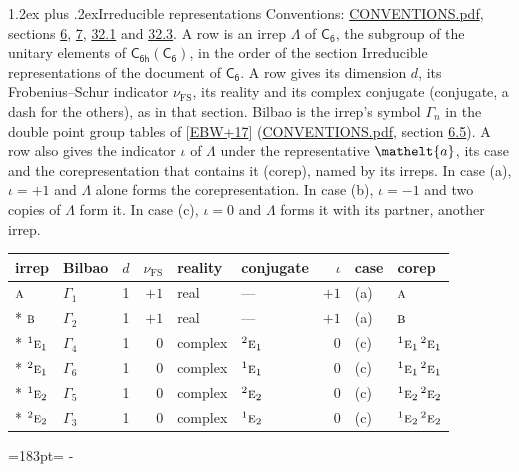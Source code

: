 \documentclass[10pt,a4paper]{article}
\makeatletter
\renewcommand\section{\@startsection{section}{1}{\z@}{-3ex plus -1ex minus -.2ex}%
  {1.2ex plus .2ex}{\normalfont\large\sffamily\bfseries\color{parttitle}}}
\newcommand{\needspace}[1]{\par\penalty-100\begingroup\dimen0=#1\relax\dimen2=\pagegoal
  \advance\dimen2-\pagetotal\ifdim\dimen0>\dimen2\relax\ifdim\dimen2>0pt\vfil\break\fi\fi
  \endgroup}
\numberwithin{equation}{section}
\newcommand{\eltfont}[1]{{\let\sigma\eltsigma\mathelt{#1}}}
\newcommand{\grp}[1]{\mathsf{#1}}
\newcommand{\irr}[1]{\text{\normalfont\scshape #1}}
\newcommand{\conjpair}[1]{{}^{#1}}
\newcommand{\elt}[1]{\eltfont{#1}}
\newcommand{\fsind}{\nu_{\mathrm{FS}}}
\makeatother
\begin{document}
\section{Irreducible representations}\label{s:irreps}
Conventions: \href{../../CONVENTIONS.pdf}{CONVENTIONS.pdf}, sections \href{../../../rotation/CONVENTIONS.pdf\#conv.6}{6}, \href{../../../rotation/CONVENTIONS.pdf\#conv.7}{7}, \href{../../CONVENTIONS.pdf\#conv.32.1}{32.1} and \href{../../CONVENTIONS.pdf\#conv.32.3}{32.3}.
\leavevmode\label{n:irrep.Delta}A row is an irrep $\Lambda$ of $\grp{C_{6}}$, the subgroup of the unitary elements of $\grp{C_{6h}}(\grp{C_{6}})$, in the order of the section Irreducible representations of the document of \href{../../../rotation/data/pdf/C6.pdf}{$\grp{C_{6}}$}. \label{n:index.dimension}\label{n:index.frobenius}\label{n:head.irrep}\label{n:head.reality}\label{n:head.conjugate}A row gives its dimension $d$, its Frobenius--Schur indicator $\fsind$, its reality and its complex conjugate (conjugate, a dash for the others), as in that section. \label{n:head.bilbao}\label{n:irrep.alias.gamma}Bilbao is the irrep's symbol $\Gamma_n$ in the double point group tables of [\href{../../../REFERENCES.pdf\#ref.EBW+17}{EBW+17}] (\href{../../CONVENTIONS.pdf}{CONVENTIONS.pdf}, section \href{../../../rotation/CONVENTIONS.pdf\#conv.6.5}{6.5}). \label{n:head.case.corep}\label{n:head.corep}A row also gives the indicator $\iota$ of $\Lambda$ under the representative $\elt{a}$, its case and the corepresentation that contains it (corep), named by its irreps. In case (a), $\iota = +1$ and $\Lambda$ alone forms the corepresentation. In case (b), $\iota = -1$ and two copies of $\Lambda$ form it. In case (c), $\iota = 0$ and $\Lambda$ forms it with its partner, another irrep.
\setlength{\emergencystretch}{2em}\par\setlength{\emergencystretch}{0pt}
{\small\renewcommand{\arraystretch}{1.25}\setlength{\tabcolsep}{4pt}\begin{longtable}{@{}llrrllrll@{}}\toprule
irrep & Bilbao & $d$ & $\fsind$ & reality & conjugate & $\iota$ & case & corep\\\midrule\endhead
\bottomrule\endfoot\endlastfoot
$\irr{a}$ & $\Gamma_{1}$ & 1 & $+1$ & real & --- & $+1$ & (a) & $\irr{a}$\\*
$\irr{b}$ & $\Gamma_{2}$ & 1 & $+1$ & real & --- & $+1$ & (a) & $\irr{b}$\\*
$\conjpair{1}\irr{e}_{1}$ & $\Gamma_{4}$ & 1 & $0$ & complex & $\conjpair{2}\irr{e}_{1}$ & $0$ & (c) & $\conjpair{1}\irr{e}_{1}\,\conjpair{2}\irr{e}_{1}$\\*
$\conjpair{2}\irr{e}_{1}$ & $\Gamma_{6}$ & 1 & $0$ & complex & $\conjpair{1}\irr{e}_{1}$ & $0$ & (c) & $\conjpair{1}\irr{e}_{1}\,\conjpair{2}\irr{e}_{1}$\\*
$\conjpair{1}\irr{e}_{2}$ & $\Gamma_{5}$ & 1 & $0$ & complex & $\conjpair{2}\irr{e}_{2}$ & $0$ & (c) & $\conjpair{1}\irr{e}_{2}\,\conjpair{2}\irr{e}_{2}$\\*
$\conjpair{2}\irr{e}_{2}$ & $\Gamma_{3}$ & 1 & $0$ & complex & $\conjpair{1}\irr{e}_{2}$ & $0$ & (c) & $\conjpair{1}\irr{e}_{2}\,\conjpair{2}\irr{e}_{2}$\\
\bottomrule\end{longtable}}
\needspace{183pt}
\end{document}
